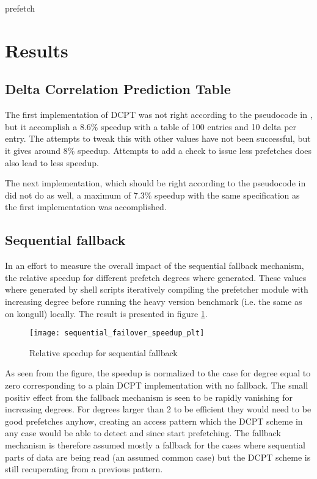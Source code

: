 \documentclass[12pt,journal,compsoc]{IEEEtran}
\begin{document}
\begin{algorithm}[H]
\dontprintsemicolon
{}

\caption{prefetch\label{pre}}
\end{algorithm}

\section{Results}
\subsection{Delta Correlation Prediction Table}
The first implementation of DCPT was not right according to the pseudocode in \cite{dcptpaper}, but it accomplish a 8.6\% speedup with a table of 100 entries and 10 delta per entry.
The attempts to tweak this with other values have not been successful, but it gives around 8\% speedup.
Attempts to add a check to issue less prefetches does also lead to less speedup.

The next implementation, which should be right according to the pseudocode in \cite{dcptpaper} did not do as well, a maximum of 7.3\% speedup with the same specification as the first implementation was accomplished.

\subsection{Sequential fallback}
In an effort to measure the overall impact of the sequential fallback
mechanism, the relative speedup for different prefetch degrees where
generated. These values where generated by shell scripts iteratively
compiling the prefetcher module with increasing degree before running
the heavy version benchmark (i.e. the same as on kongull) locally. The
result is presented in figure \ref{fig:fallback}.

\begin{figure}
\begin{center}
\texttt{[image: sequential\_failover\_speedup\_plt]}
\end{center}
\caption{\label{fig:fallback} Relative speedup for sequential fallback}
\end{figure}

As seen from the figure, the speedup is normalized to the case for degree equal
to zero corresponding to a plain DCPT implementation with no fallback. The
small positiv effect from the fallback mechanism is seen to be rapidly
vanishing for increasing degrees. For degrees larger than 2 to be efficient
they would need to be good prefetches anyhow, creating an access pattern which
the DCPT scheme in any case would be able to detect and since start
prefetching. The fallback mechanism is therefore assumed mostly a fallback for
the cases where sequential parts of data are being read
(an assumed common case) but the DCPT scheme is still recuperating from a
previous pattern.
\end{document}
